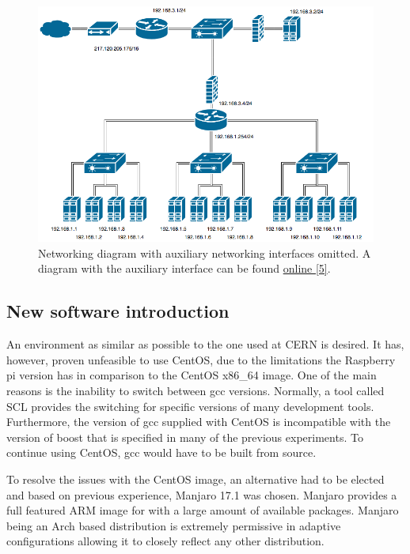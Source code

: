 \documentclass[]{article}
\begin{document}
\begin{center}
	\begin{figure}[H]
		\includegraphics[width=\textwidth]{images/network-primary}
		\caption{Networking diagram with auxiliary networking interfaces omitted. A diagram with the auxiliary interface can be found \hyperref[sec:ref05]{online [5]}.}
		\label{fig:ssh}
	\end{figure}
\end{center}

\subsection{New software introduction}
An environment as similar as possible to the one used at CERN is desired. It has, however, proven unfeasible to use CentOS, due to the limitations the Raspberry pi version has in comparison to the CentOS x86\_64 image. One of the main reasons is the inability to switch between gcc versions. Normally, a tool called SCL provides the switching for specific versions of many development tools. Furthermore, the version of gcc supplied with CentOS is incompatible with the version of boost that is specified in many of the previous experiments. To continue using CentOS, gcc would have to be built from source.

To resolve the issues with the CentOS image, an alternative had to be elected and based on previous experience, Manjaro 17.1 was chosen. Manjaro provides a full featured ARM image for with a large amount of available packages. Manjaro being an Arch based distribution is extremely permissive in adaptive configurations allowing it to closely reflect any other distribution.
\end{document}
